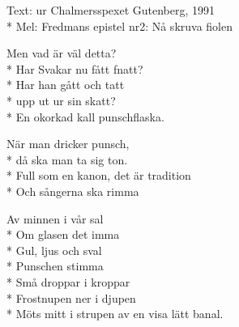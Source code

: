 \begin{SongText}
    \begin{SongInfo}
        Text: ur Chalmersspexet Gutenberg, 1991\\*%
        Mel: Fredmans epistel nr2: Nå skruva fiolen
    \end{SongInfo}
    \begin{SongVerse}
        Men vad är väl detta?\\*%
        Har Svakar nu fått fnatt?\\*%
        Har han gått och tatt\\*%
        upp ut ur sin skatt?\\*%
        En okorkad kall punschflaska.
    \end{SongVerse}
    \begin{SongVerse}
        När man dricker punsch,\\*%
        då ska man ta sig ton.\\*%
        Full som en kanon, det är tradition\\*%
        Och sångerna ska rimma
    \end{SongVerse}
    \begin{SongVerse}
        Av minnen i vår sal\\*%
        Om glasen det imma\\*%
        Gul, ljus och sval\\*%
        Punschen stimma\\*%
        Små droppar i kroppar\\*%
        Frostnupen ner i djupen\\*%
        Möts mitt i strupen av en visa lätt banal.
    \end{SongVerse}
\end{SongText}